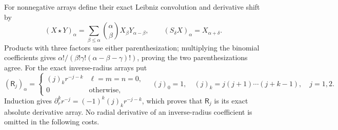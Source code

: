 For nonnegative arrays define their exact Leibniz convolution and
derivative shift by
\begin{equation}\label{mcmean:convolution}
 (X\star Y)_\alpha=\sum_{\beta\le\alpha}
               \binom\alpha\beta X_\beta Y_{\alpha-\beta},
 \qquad (S_\delta X)_\alpha=X_{\alpha+\delta}.
\end{equation}
Products with three factors use either parenthesization; multiplying
the binomial coefficients gives
\(\alpha!/(\beta!\gamma!(\alpha-\beta-\gamma)!)\), proving the
two parenthesizations agree. For the exact inverse-radius arrays put
\begin{equation}\label{mcmean:radius_array}
 (\mathsf R_j)_\alpha=
 \begin{cases}
 (j)_k r^{-j-k}&\ell=m=n=0,\\0&\text{otherwise},
 \end{cases}
 \quad (j)_0=1,\quad(j)_k=j(j+1)\cdots(j+k-1),\quad j=1,2.
\end{equation}
Induction gives \(\partial_r^k r^{-j}=(-1)^k(j)_kr^{-j-k}\),
which proves that \(\mathsf R_j\) is its exact absolute derivative
array. No radial derivative of an inverse-radius coefficient is
omitted in the following costs.

